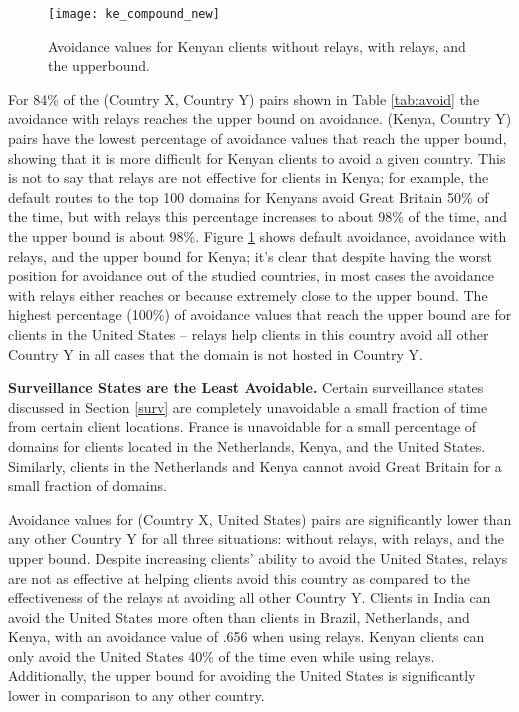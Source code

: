\begin{figure}
\centering
\texttt{[image: ke\_compound\_new]}
\caption{Avoidance values for Kenyan clients without relays, with relays, and the upperbound.}
\label{fig:ke_avoidance}
\end{figure}

For 84\% of the (Country X, Country Y) pairs shown in Table \ref{tab:avoid} the avoidance with relays reaches the upper bound on avoidance.  (Kenya, Country Y) pairs have the lowest percentage of avoidance values that reach the upper bound, showing that it is more difficult for Kenyan clients to avoid a given country.  This is not to say that relays are not effective for clients in Kenya; for example, the default routes to the top 100 domains for Kenyans avoid Great Britain 50\% of the time, but with relays this percentage increases to about 98\% of the time, and the upper bound is about 98\%. Figure \ref{fig:ke_avoidance} shows default avoidance, avoidance with relays, and the upper bound for Kenya; it's clear that despite having the worst position for avoidance out of the studied countries, in most cases the avoidance with relays either reaches or because extremely close to the upper bound.  The highest percentage (100\%) of avoidance values that reach the upper bound are for clients in the United States -- relays help clients in this country avoid all other Country Y in all cases that the domain is not hosted in Country Y.  

{\bf Surveillance States are the Least Avoidable.}
Certain surveillance states discussed in Section \ref{surv} are completely unavoidable a small fraction of time from certain client locations.  France is unavoidable for a small percentage of domains for clients located in the Netherlands, Kenya, and the United States.  Similarly, clients in the Netherlands and Kenya cannot avoid Great Britain for a small fraction of domains.  

Avoidance values for (Country X, United States) pairs are significantly lower than any other Country Y for all three situations: without relays, with relays, and the upper bound.   Despite increasing clients' ability to avoid the United States, relays are not as effective at helping clients avoid this country as compared to the effectiveness of the relays at avoiding all other Country Y.  Clients in India can avoid the United States more often than clients in Brazil, Netherlands, and Kenya, with an avoidance value of .656 when using relays.  Kenyan clients can only avoid the United States 40\% of the time even while using relays.  Additionally, the upper bound for avoiding the United States is significantly lower in comparison to any other country.  


